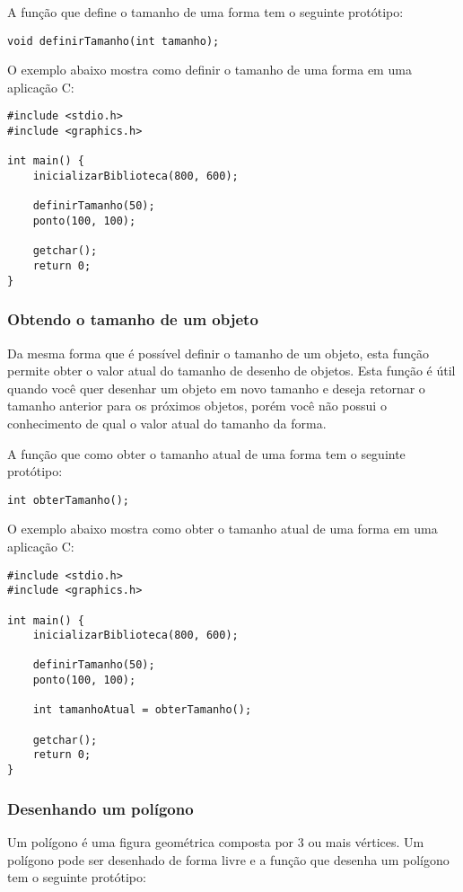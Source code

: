 \documentclass[12pt, %
openright,
oneside, %
a4paper,    %
brazil]{facom-ufu-abntex2}
\begin{document}
A função que define o tamanho de uma forma tem o seguinte protótipo:

\begin{verbatim}
void definirTamanho(int tamanho);
\end{verbatim}

O exemplo abaixo mostra como definir o tamanho de uma forma em uma aplicação C:

\begin{verbatim}
#include <stdio.h>
#include <graphics.h>

int main() {
    inicializarBiblioteca(800, 600);

    definirTamanho(50);
    ponto(100, 100);

    getchar();
    return 0;
}
\end{verbatim}

\subsubsection{Obtendo o tamanho de um objeto}
Da mesma forma que é possível definir o tamanho de um objeto, esta função permite obter o valor atual do tamanho de desenho de objetos. Esta função é útil quando você quer desenhar um objeto em novo tamanho e deseja retornar o tamanho anterior para os próximos objetos, porém você não possui o conhecimento de qual o valor atual do tamanho da forma.

A função que como obter o tamanho atual de uma forma tem o seguinte protótipo:

\begin{verbatim}
int obterTamanho();
\end{verbatim}

O exemplo abaixo mostra como obter o tamanho atual de uma forma em uma aplicação C:

\begin{verbatim}
#include <stdio.h>
#include <graphics.h>

int main() {
    inicializarBiblioteca(800, 600);

    definirTamanho(50);
    ponto(100, 100);

    int tamanhoAtual = obterTamanho();

    getchar();
    return 0;
}
\end{verbatim}

\subsubsection{Desenhando um polígono}
Um polígono é uma figura geométrica composta por 3 ou mais vértices. Um polígono pode ser desenhado de forma livre e a função que desenha um polígono tem o seguinte protótipo:
\end{document}
